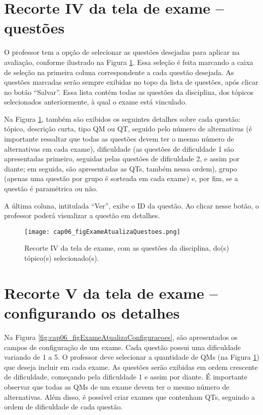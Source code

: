 \section{Recorte IV da tela de exame -- questões}

O professor tem a opção de selecionar as questões desejadas para aplicar na avaliação, conforme ilustrado na Figura \ref{fig:cap06_figExameAtualizaQuestoes}. Essa seleção é feita marcando a caixa de seleção na primeira coluna correspondente a cada questão desejada. As questões marcadas serão sempre exibidas no topo da lista de questões, após clicar no botão ``Salvar''. Essa lista contém todas as questões da disciplina, dos tópicos selecionados anteriormente, à qual o exame está vinculado.

Na Figura \ref{fig:cap06_figExameAtualizaQuestoes}, também são exibidos os seguintes detalhes sobre cada questão: tópico, descrição curta, tipo QM ou QT, seguido pelo número de alternativas (é importante ressaltar que todas as questões devem ter o mesmo número de alternativas em cada exame), dificuldade (as questões de dificuldade 1 são apresentadas primeiro, seguidas pelas questões de dificuldade 2, e assim por diante; em seguida, são apresentadas as QTs, também nessa ordem), grupo (apenas uma questão por grupo é sorteada em cada exame) e, por fim, se a questão é paramétrica ou não.

A última coluna, intitulada ``Ver'', exibe o ID da questão. Ao clicar nesse botão, o professor poderá visualizar a questão em detalhes.

\begin{figure}[!t]
  \centering
  \texttt{[image: cap06\_figExameAtualizaQuestoes.png]}
  \caption{Recorte IV da tela de exame, com as questões da disciplina, do(s) tópico(s) selecionado(s).}
  \label{fig:cap06_figExameAtualizaQuestoes}\vspace{-3mm}
\end{figure}

\section{Recorte V da tela de exame -- configurando os detalhes}\label{sec:exameDetalhes}

Na Figura \ref{fig:cap06_figExameAtualizaConfiguracoes}, são apresentados os campos de configuração de um exame. Cada questão possui uma dificuldade variando de 1 a 5. O professor deve selecionar a quantidade de QMs (na Figura \ref{fig:cap06_figExameAtualizaQuestoes}) que deseja incluir em cada exame. As questões serão exibidas em ordem crescente de dificuldade, começando pela dificuldade 1 e assim por diante. É importante observar que todas as QMs de um exame devem ter o mesmo número de alternativas. Além disso, é possível criar exames que contenham QTs, seguindo a ordem de dificuldade de cada questão.

